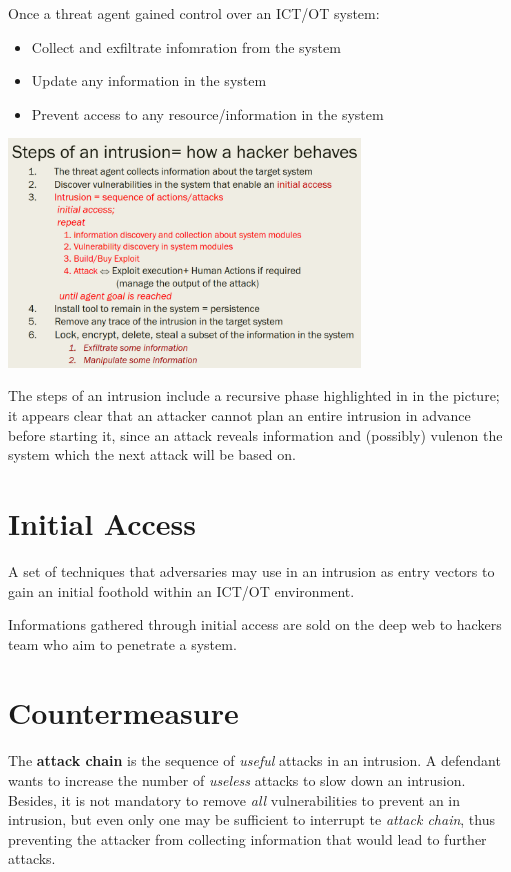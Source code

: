 Once a threat agent gained control over an ICT/OT system:
\begin{itemize}
    \item Collect and exfiltrate infomration from the system
    \item Update any information in the system
    \item Prevent access to any resource/information in the system
\end{itemize}
\begin{center}
\includegraphics[width=0.7\textwidth]{images/intrusion_steps.png}
\end{center}
The steps of an intrusion include a recursive phase highlighted in  in the picture;
it appears clear that an attacker cannot plan an entire intrusion in advance before starting it,
since an attack reveals information and (possibly) vulenon the system which the next attack will be based on.

\section{Initial Access}
A set of techniques that adversaries may use in an intrusion as entry vectors to gain an initial foothold within an ICT/OT environment.

Informations gathered through initial access are sold on the deep web to hackers team who aim to penetrate a system.

\section{Countermeasure}
The \textbf{attack chain} is the sequence of \textit{useful} attacks in an intrusion.
A defendant wants to increase the number of \textit{useless} attacks to slow down an intrusion.
Besides, it is not mandatory to remove \textit{all} vulnerabilities to prevent an in intrusion,
but even only one may be sufficient to interrupt te \textit{attack chain}, 
thus preventing the attacker from collecting information that would lead to further attacks.\nl

